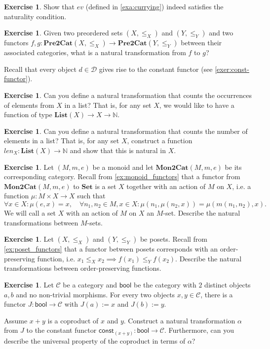 \documentclass[a4paper,11pt, oneside,titlepage=false]{scrbook}
\theoremstyle{plain}
\theoremstyle{definition}
\newtheorem{exer}[thm]{Exercise}
\newcommand{\Cat}[1]{\mathcal{#1}}
\newcommand{\CC}{\Cat{C}}
\newcommand{\DD}{\Cat{D}}
\newcommand{\Catb}[1]{\mathbf{#1}}
\newcommand{\List}{\Catb{List}}
\newcommand{\SET}{\Catb{Set}}
\newcommand{\PREtoCAT}{\Catb{Pre2Cat}}
\newcommand{\MONtoCAT}{\Catb{Mon2Cat}}
\newcommand{\NN}{\ensuremath{\mathbb{N}}}
\begin{document}
\begin{exer}
Show that $ev$ (defined in \cref{exa:currying}) indeed satisfies the naturality condition.
\end{exer}

\begin{exer}
  Given two preordered sets $(X,\leq_X)$ and $(Y, \leq_Y)$ and two functors $f, g : \PREtoCAT(X,\leq_X) \to \PREtoCAT(Y,\leq_Y)$ between their associated categories, what is a natural transformation from $f$ to $g$?
\end{exer}

Recall that every object $d \in \DD$ gives rise to the constant functor (see \cref{exer:const-functor}).

\begin{exer}
  Can you define a natural transformation that counts the occurrences of elements from $X$ in a list?
  That is, for any set $X$, we would like to have a function of type $\List(X) \to X \to \NN$.
\end{exer}

\begin{exer}
Can you define a natural transformation that counts the number of elements in a list?
That is, for any set $X$, construct a function $len_X : \List(X) \to \NN$ and show that this is natural in $X$.
\end{exer}

\begin{exer}
  Let $(M,m,e)$ be a monoid and let $\MONtoCAT(M,m,e)$ be its corresponding category. Recall from \cref{ex:monoid_functors} that a functor from $\MONtoCAT(M,m,e)$ to $\SET$ is a set $X$ together with an action of $M$ on $X$, i.e. a function $\mu: M\times X\to X$ such that
  \[
    \forall x\in X: \mu(e,x) = x, \quad \forall n_1,n_2\in M, x\in X: \mu(n_1, \mu(n_2,x)) = \mu(m(n_1,n_2), x).
  \]
  We will call a set $ X $ with an action of $ M $ on $ X $ an $ M $-set.
  Describe the natural transformations between $M$-sets.
\end{exer}

\begin{exer}
  Let $(X,\leq_X)$ and $(Y,\leq_Y)$ be posets.
  Recall from \cref{ex:poset_functors} that a functor between posets corresponds with an order-preserving function, i.e. $x_1 \leq_X x_2 \implies f(x_1) \leq_Y f(x_2)$.
  Describe the natural transformations between order-preserving functions.
\end{exer}

\begin{exer}
Let $\CC$ be a category and $\mathsf{bool}$ be the category with $2$ distinct objects $a,b$ and no non-trivial morphisms.
For every two objects $x, y \in \CC$, there is a functor $J : \mathsf{bool} \to \CC$ with $J(a) := x$ and $J(b) := y$.

Assume $x + y$ is a coproduct of $x$ and $y$.
Construct a natural transformation $\alpha$ from $J$ to the constant functor $\mathsf{const}_{(x + y)} : \mathsf{bool} \to \CC$.
Furthermore, can you describe the universal property of the coproduct in terms of $\alpha$?
\end{exer}
\end{document}
